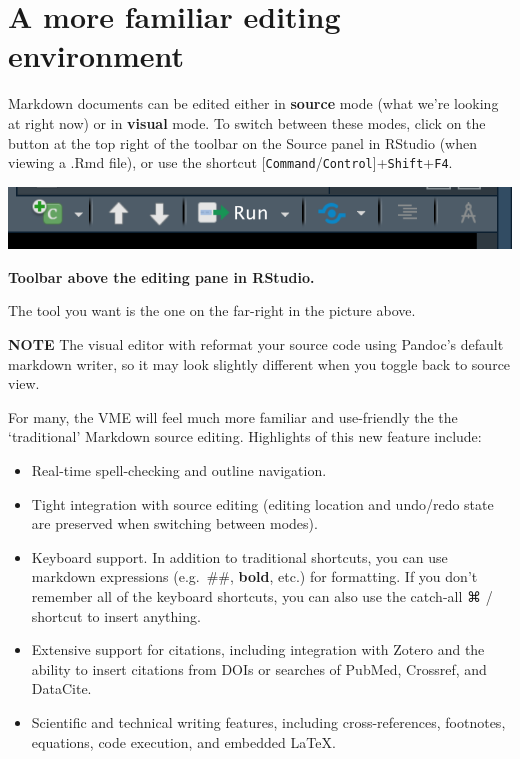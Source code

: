 \documentclass[
]{book}
\providecommand{\tightlist}{%
  \setlength{\itemsep}{0pt}\setlength{\parskip}{0pt}}
\begin{document}
\section*{A more familiar editing environment}\label{a-more-familiar-editing-environment}

Markdown documents can be edited either in \textbf{source} mode (what we're looking at right now) or in \textbf{visual} mode. To switch between these modes, click on the button at the top right of the toolbar on the Source panel in RStudio (when viewing a .Rmd file), or use the shortcut {[}\texttt{Command}/\texttt{Control}{]}+\texttt{Shift}+\texttt{F4}.

\includegraphics[width=10.31in]{./more/toolbar}

\textbf{Toolbar above the editing pane in RStudio.}

The tool you want is the one on the far-right in the picture above.

\textbf{NOTE}
The visual editor with reformat your source code using Pandoc's default markdown writer, so it may look slightly different when you toggle back to source view.

For many, the VME will feel much more familiar and use-friendly the the `traditional' Markdown source editing. Highlights of this new feature include:

\begin{itemize}
\tightlist
\item
  Real-time spell-checking and outline navigation.
\item
  Tight integration with source editing (editing location and undo/redo state are preserved when switching between modes).\\
\item
  Keyboard support. In addition to traditional shortcuts, you can use markdown expressions (e.g.~\#\#, \textbf{bold}, etc.) for formatting. If you don't remember all of the keyboard shortcuts, you can also use the catch-all ⌘ / shortcut to insert anything.\\
\item
  Extensive support for citations, including integration with Zotero and the ability to insert citations from DOIs or searches of PubMed, Crossref, and DataCite.\\
\item
  Scientific and technical writing features, including cross-references, footnotes, equations, code execution, and embedded LaTeX.
\end{itemize}
\end{document}
